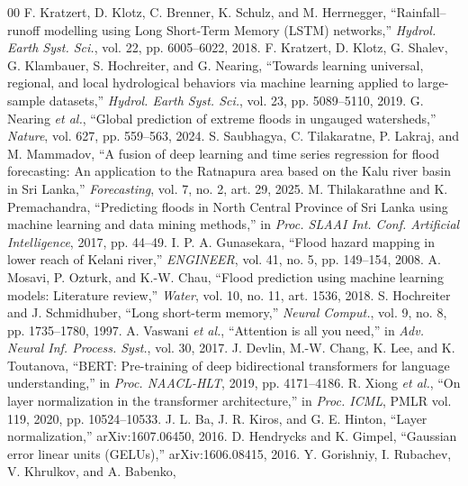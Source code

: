 \documentclass[conference]{IEEEtran}
\begin{document}
\balance
\begin{thebibliography}{00}
 F. Kratzert, D. Klotz, C. Brenner, K. Schulz, and
M. Herrnegger, ``Rainfall--runoff modelling using Long Short-Term Memory (LSTM)
networks,'' \emph{Hydrol. Earth Syst. Sci.}, vol. 22, pp. 6005--6022, 2018.
 F. Kratzert, D. Klotz, G. Shalev, G. Klambauer,
S. Hochreiter, and G. Nearing, ``Towards learning universal, regional, and local
hydrological behaviors via machine learning applied to large-sample datasets,''
\emph{Hydrol. Earth Syst. Sci.}, vol. 23, pp. 5089--5110, 2019.
 G. Nearing \emph{et al.}, ``Global prediction of extreme
floods in ungauged watersheds,'' \emph{Nature}, vol. 627, pp. 559--563, 2024.
 S. Saubhagya, C. Tilakaratne, P. Lakraj, and
M. Mammadov, ``A fusion of deep learning and time series regression for flood
forecasting: An application to the Ratnapura area based on the Kalu river basin
in Sri Lanka,'' \emph{Forecasting}, vol. 7, no. 2, art. 29, 2025.
 M. Thilakarathne and K. Premachandra, ``Predicting
floods in North Central Province of Sri Lanka using machine learning and data
mining methods,'' in \emph{Proc. SLAAI Int. Conf. Artificial Intelligence},
2017, pp. 44--49.
 I. P. A. Gunasekara, ``Flood hazard mapping in lower
reach of Kelani river,'' \emph{ENGINEER}, vol. 41, no. 5, pp. 149--154, 2008.
 A. Mosavi, P. Ozturk, and K.-W. Chau, ``Flood prediction
using machine learning models: Literature review,'' \emph{Water}, vol. 10,
no. 11, art. 1536, 2018.
 S. Hochreiter and J. Schmidhuber, ``Long short-term
memory,'' \emph{Neural Comput.}, vol. 9, no. 8, pp. 1735--1780, 1997.
 A. Vaswani \emph{et al.}, ``Attention is all you need,''
in \emph{Adv. Neural Inf. Process. Syst.}, vol. 30, 2017.
 J. Devlin, M.-W. Chang, K. Lee, and K. Toutanova, ``BERT:
Pre-training of deep bidirectional transformers for language understanding,''
in \emph{Proc. NAACL-HLT}, 2019, pp. 4171--4186.
 R. Xiong \emph{et al.}, ``On layer normalization in the
transformer architecture,'' in \emph{Proc. ICML}, PMLR vol. 119, 2020,
pp. 10524--10533.
 J. L. Ba, J. R. Kiros, and G. E. Hinton, ``Layer
normalization,'' arXiv:1607.06450, 2016.
 D. Hendrycks and K. Gimpel, ``Gaussian error linear
units (GELUs),'' arXiv:1606.08415, 2016.
 Y. Gorishniy, I. Rubachev, V. Khrulkov, and A. Babenko,

\end{thebibliography}
\end{document}
